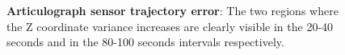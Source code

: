 \begin{figure}[!ht]
\centering

	\caption[Articulograph sensor trajectory error]{\textbf{Articulograph
	sensor trajectory error}: 
	The two regions where the Z coordinate variance increases 
	are clearly visible in the 20-40 seconds and in the 80-100 seconds 
	intervals respectively.}
	\label{fig:linguometer:technical:interference:exz}
\end{figure}
